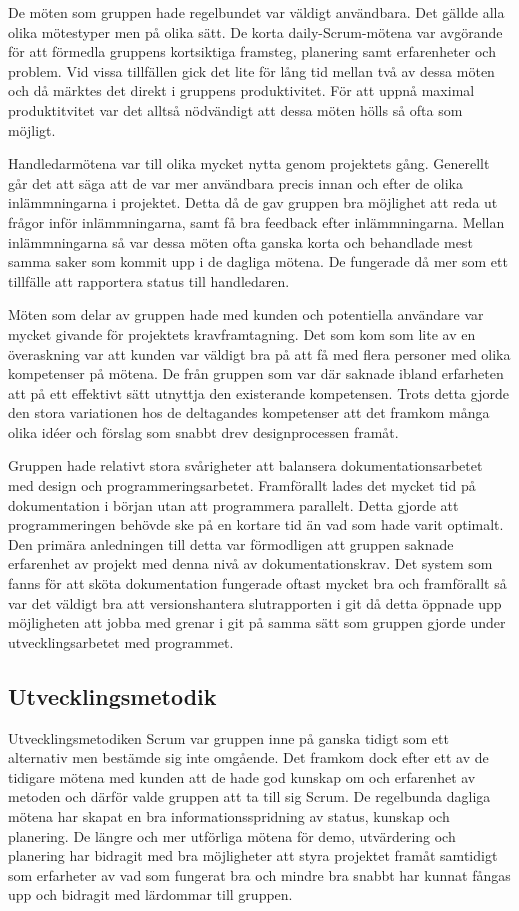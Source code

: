 De möten som gruppen hade regelbundet var väldigt användbara. Det gällde alla olika mötestyper men på olika sätt. De korta daily-Scrum-mötena var avgörande för att förmedla gruppens kortsiktiga framsteg, planering samt erfarenheter och problem. Vid vissa tillfällen gick det lite för lång tid mellan två av dessa möten och då märktes det direkt i gruppens produktivitet. För att uppnå maximal produktitvitet var det alltså nödvändigt att dessa möten hölls så ofta som möjligt.

Handledarmötena var till olika mycket nytta genom projektets gång. Generellt går det att säga att de var mer användbara precis innan och efter de olika inlämmningarna i projektet. Detta då de gav gruppen bra möjlighet att reda ut frågor inför inlämmningarna, samt få bra feedback efter inlämmningarna.
Mellan inlämmningarna så var dessa möten ofta ganska korta och behandlade mest samma saker som kommit upp i de dagliga mötena. De fungerade då mer som ett tillfälle att rapportera status till handledaren.

Möten som delar av gruppen hade med kunden och potentiella användare var mycket givande för projektets kravframtagning. Det som kom som lite av en överaskning var att kunden var väldigt bra på att få med flera personer med olika kompetenser på mötena. De från gruppen som var där saknade ibland erfarheten att på ett effektivt sätt utnyttja den existerande kompetensen.
Trots detta gjorde den stora variationen hos de deltagandes kompetenser att det framkom många olika idéer och förslag som snabbt drev designprocessen framåt.

Gruppen hade relativt stora svårigheter att balansera dokumentationsarbetet med design och programmeringsarbetet. Framförallt lades det mycket tid på dokumentation i början utan att programmera parallelt. Detta gjorde att programmeringen behövde ske på en kortare tid än vad som hade varit optimalt. Den primära anledningen till detta var förmodligen att gruppen saknade erfarenhet av projekt med denna nivå av dokumentationskrav. Det system som fanns för att sköta dokumentation fungerade oftast mycket bra och framförallt så var det väldigt bra att versionshantera slutrapporten i git då detta öppnade upp möjligheten att jobba med grenar i git på samma sätt som gruppen gjorde under utvecklingsarbetet med programmet.

\subsection{Utvecklingsmetodik}
Utvecklingsmetodiken Scrum var gruppen inne på ganska tidigt som ett alternativ men bestämde sig inte omgående. Det framkom dock efter ett av de tidigare mötena med kunden att de hade god kunskap om och erfarenhet av metoden och därför valde gruppen att ta till sig Scrum. De regelbunda dagliga mötena har skapat en bra informationsspridning av status, kunskap och planering. De längre och mer utförliga mötena för demo, utvärdering och planering har bidragit med bra möjligheter att styra projektet framåt samtidigt som erfarheter av vad som fungerat bra och mindre bra snabbt har kunnat fångas upp och bidragit med lärdommar till gruppen.

